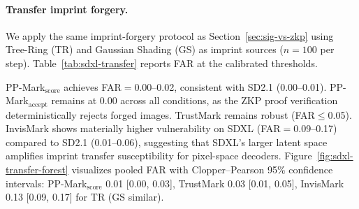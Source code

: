 \documentclass{article}
\theoremstyle{plain}
\theoremstyle{definition}
\theoremstyle{remark}
\begin{document}
\paragraph{Transfer imprint forgery.}
We apply the same imprint-forgery protocol as Section~\ref{sec:sig-vs-zkp} using Tree-Ring (TR) and Gaussian Shading (GS) as imprint sources ($n{=}100$ per step). Table~\ref{tab:sdxl-transfer} reports FAR at the calibrated thresholds.

PP-Mark$_{\mathrm{score}}$ achieves FAR$=$0.00--0.02, consistent with SD2.1 (0.00--0.01). PP-Mark$_{\mathrm{accept}}$ remains at 0.00 across all conditions, as the ZKP proof verification deterministically rejects forged images. TrustMark remains robust (FAR$\leq$0.05). InvisMark shows materially higher vulnerability on SDXL (FAR$=$0.09--0.17) compared to SD2.1 (0.01--0.06), suggesting that SDXL's larger latent space amplifies imprint transfer susceptibility for pixel-space decoders. Figure~\ref{fig:sdxl-transfer-forest} visualizes pooled FAR with Clopper--Pearson 95\% confidence intervals: PP-Mark$_{\mathrm{score}}$ 0.01 [0.00, 0.03], TrustMark 0.03 [0.01, 0.05], InvisMark 0.13 [0.09, 0.17] for TR (GS similar).
\end{document}
